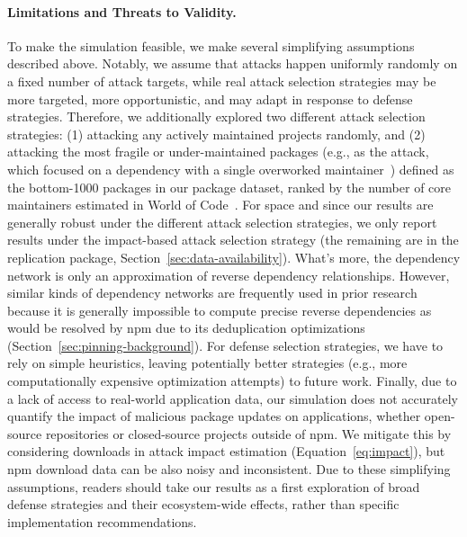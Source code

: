 \paragraph{Limitations and Threats to Validity.}
To make the simulation feasible, we make several simplifying assumptions described above.
Notably, we assume that  attacks happen uniformly randomly on a fixed number of attack targets, while real attack selection strategies may be more targeted, more opportunistic, and may adapt in response to defense strategies.
Therefore, we additionally explored two different attack selection strategies: (1) attacking any actively maintained projects randomly, and (2) attacking the most fragile or under-maintained packages (e.g., as the  attack, which focused on a dependency with a single overworked maintainer~\cite{xz-utils}) defined as the bottom-1000 packages in our package dataset, ranked by the number of core maintainers estimated in World of Code~\cite{DBLP:journals/ese/MaDBAVTKZM21}. For space and since our results are generally robust under the different attack selection strategies, we only report results under the impact-based attack selection strategy (the remaining are in the replication package, Section~\ref{sec:data-availability}).
What's more, the dependency network is only an approximation of reverse dependency relationships. 
However, similar kinds of dependency networks are frequently used in prior research~\cite{DBLP:journals/ese/DecanMG19, DBLP:conf/uss/ZimmermannSTP19} because it is generally impossible to compute precise reverse dependencies as would be resolved by npm due to its deduplication optimizations (Section~\ref{sec:pinning-background}).
For defense selection strategies, we have to rely on simple heuristics, leaving potentially better strategies (e.g., more computationally expensive optimization attempts) to future work.
Finally, due to a lack of access to real-world application data, our simulation does not accurately quantify the impact of malicious package updates on applications, whether open-source repositories or closed-source projects outside of npm.
We mitigate this by considering downloads in attack impact estimation (Equation~\ref{eq:impact}), but npm download data can be also noisy and inconsistent.
Due to these simplifying assumptions, readers should take our results as a first exploration of broad defense strategies and their ecosystem-wide effects, rather than specific implementation recommendations.

